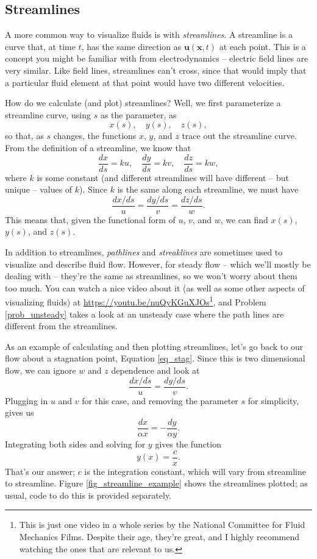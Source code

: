 \subsection{Streamlines}

A more common way to visualize fluids is with \emph{streamlines}.  A streamline is a curve that, at time \(t\), has the same direction as \(\mathbf{u}(\mathbf{x}, t)\) at each point. This is a concept you might be familiar with from electrodynamics -- electric field lines are very similar.  Like field lines, streamlines can't cross, since that would imply that a particular fluid element at that point would have two different velocities.  

How do we calculate (and plot) streamlines? Well, we first parameterize a streamline curve, using \(s\) as the parameter, as 
\[
x(s), \quad y(s), \quad z(s),
\] 
so that, as \(s\) changes, the functions $x$, $y$, and $z$ trace out the streamline curve.   From the definition of a streamline, we know that
\[
\frac{dx}{ds} = ku, \quad \frac{dy}{ds} = kv, \quad \frac{dz}{ds} = kw,
\] 
where \(k\) is some constant (and different streamlines will have different -- but unique -- values of \(k\)). Since \(k\) is the same along each streamline, we must have
\begin{equation}
\frac{dx/ds}{u} = \frac{dy/ds}{v} = \frac{dz/ds}{w}.
\end{equation} 
This means that, given the functional form of \(u\), \(v\), and
\(w\), we can find \(x(s)\), \(y(s)\), and \(z(s)\).

In addition to streamlines, \emph{pathlines} and \emph{streaklines} are sometimes used to visualize and describe fluid flow.  However, for steady flow -- which we'll mostly be dealing with -- they're the same as streamlines, so we won't worry about them too much.  You can watch a nice video about it (as well as some other aspects of visualizing fluids) at \url{https://youtu.be/nuQyKGuXJOs}\footnote{This is just one video in a whole series by the National Committee for Fluid Mechanics Films.  Despite their age, they're great, and I highly recommend watching the ones that are relevant to us.}, and Problem \ref{prob_unsteady} takes a look at an unsteady case where the path lines are different from the streamlines.

\begin{example}
As an example of calculating and then plotting streamlines, let's go back to our flow about a stagnation point, Equation \ref{eq_stag}.  Since this is two dimensional flow, we can ignore $w$ and $z$ dependence and look at 
\[
\frac{dx/ds}{u} = \frac{dy/ds}{v}.
\]
Plugging in \(u\) and \(v\) for this case, and removing the parameter $s$ for simplicity, gives us
\[
\frac{dx}{\alpha x} = -\frac{dy}{\alpha y}.
\] 
Integrating both sides and solving for \(y\) gives the function 
\begin{equation}
y(x) = \frac{c}{x}.
\label{eq_stream_ex}
\end{equation}
That's our answer; \(c\) is the integration constant, which will vary from streamline to streamline.  Figure \ref{fig_streamline_example} shows the streamlines plotted; as usual, code to do this is provided separately.
\end{example}


